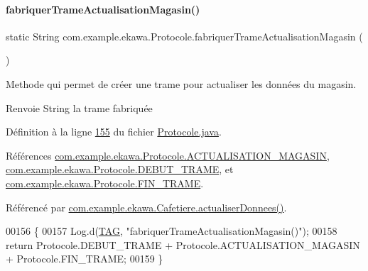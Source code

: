 \paragraph{\texorpdfstring{fabriquer\+Trame\+Actualisation\+Magasin()}{fabriquerTrameActualisationMagasin()}}
{\footnotesize\ttfamily static String com.\+example.\+ekawa.\+Protocole.\+fabriquer\+Trame\+Actualisation\+Magasin (\begin{DoxyParamCaption}{ }\end{DoxyParamCaption})\hspace{0.3cm}{\ttfamily [static]}}



Methode qui permet de créer une trame pour actualiser les données du magasin. 

\begin{DoxyReturn}{Renvoie}
String la trame fabriquée 
\end{DoxyReturn}


Définition à la ligne \hyperlink{_protocole_8java_source_l00155}{155} du fichier \hyperlink{_protocole_8java_source}{Protocole.\+java}.



Références \hyperlink{_protocole_8java_source_l00035}{com.\+example.\+ekawa.\+Protocole.\+A\+C\+T\+U\+A\+L\+I\+S\+A\+T\+I\+O\+N\+\_\+\+M\+A\+G\+A\+S\+IN}, \hyperlink{_protocole_8java_source_l00025}{com.\+example.\+ekawa.\+Protocole.\+D\+E\+B\+U\+T\+\_\+\+T\+R\+A\+ME}, et \hyperlink{_protocole_8java_source_l00026}{com.\+example.\+ekawa.\+Protocole.\+F\+I\+N\+\_\+\+T\+R\+A\+ME}.



Référencé par \hyperlink{_cafetiere_8java_source_l00495}{com.\+example.\+ekawa.\+Cafetiere.\+actualiser\+Donnees()}.


\begin{DoxyCode}
00156     \{
00157         Log.d(\hyperlink{classcom_1_1example_1_1ekawa_1_1_protocole_ae9b68fa0daac528421b887f19413f8f5}{TAG}, \textcolor{stringliteral}{"fabriquerTrameActualisationMagasin()"});
00158         \textcolor{keywordflow}{return} Protocole.DEBUT\_TRAME + Protocole.ACTUALISATION\_MAGASIN + Protocole.FIN\_TRAME;
00159     \}
\end{DoxyCode}
\mbox{\label{classcom_1_1example_1_1ekawa_1_1_protocole_ac967186423a451ede7e4b9bc16a96222}} 
